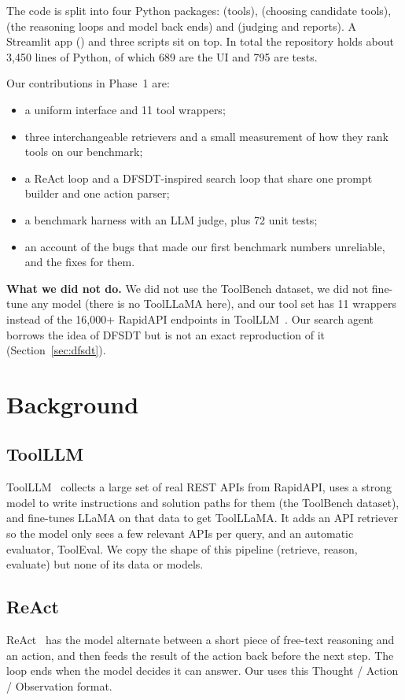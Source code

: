 \documentclass[conference,a4paper]{IEEEtran}
\begin{document}
The code is split into four Python packages:  (tools),
 (choosing candidate tools),  (the reasoning
loops and model back ends) and  (judging and reports). A
Streamlit app () and three scripts sit on top. In total the
repository holds about 3{,}450 lines of Python, of which 689 are the UI
and 795 are tests.

Our contributions in Phase~1 are:
\begin{itemize}
  \item a uniform  interface and 11 tool wrappers;
  \item three interchangeable retrievers and a small measurement of how
        they rank tools on our benchmark;
  \item a ReAct loop and a DFSDT-inspired search loop that share one
        prompt builder and one action parser;
  \item a benchmark harness with an LLM judge, plus 72 unit tests;
  \item an account of the bugs that made our first benchmark numbers
        unreliable, and the fixes for them.
\end{itemize}

\noindent\textbf{What we did not do.} We did not use the ToolBench
dataset, we did not fine-tune any model (there is no ToolLLaMA here), and
our tool set has 11 wrappers instead of the 16{,}000+ RapidAPI endpoints
in ToolLLM~\cite{qin2024toolllm}. Our search agent borrows the idea of
DFSDT but is not an exact reproduction of it (Section~\ref{sec:dfsdt}).

\section{Background}

\subsection{ToolLLM}
ToolLLM~\cite{qin2024toolllm} collects a large set of real REST APIs from
RapidAPI, uses a strong model to write instructions and solution paths for
them (the ToolBench dataset), and fine-tunes LLaMA on that data to get
ToolLLaMA. It adds an API retriever so the model only sees a few relevant
APIs per query, and an automatic evaluator, ToolEval. We copy the shape of
this pipeline (retrieve, reason, evaluate) but none of its data or models.

\subsection{ReAct}
ReAct~\cite{yao2023react} has the model alternate between a short piece
of free-text reasoning and an action, and then feeds the result of the
action back before the next step. The loop ends when the model decides it
can answer. Our  uses this Thought / Action /
Observation format.
\end{document}
